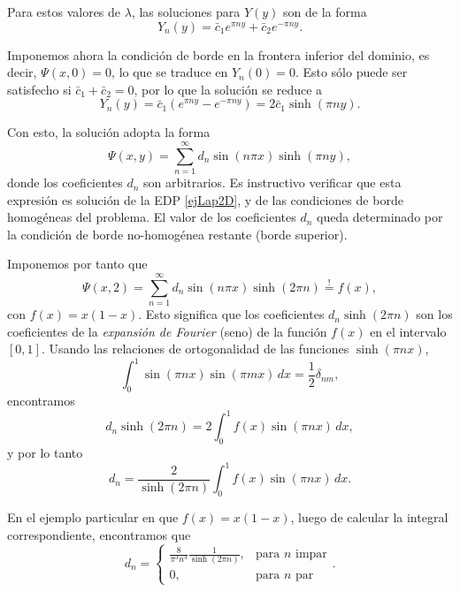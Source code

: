 Para estos valores de $\lambda$, las soluciones para $Y(y)$ son de la forma
\begin{equation}
    Y_n(y) = \bar{c}_1e^{\pi ny} + \bar{c}_2e^{-\pi ny}.
\end{equation}

Imponemos ahora la condición de borde en la frontera inferior del dominio, es decir, $\Psi(x,0) = 0$, lo que se traduce en $Y_n(0)=0$. Esto sólo puede ser satisfecho si $\bar{c}_1+\bar{c}_2=0$, por lo que la solución se reduce a
\begin{equation}
    Y_n(y) = \bar{c}_1\left(e^{\pi ny} -e^{-\pi ny}\right) = 2\bar{c}_1 \sinh(\pi ny).
\end{equation}

Con esto, la solución adopta la forma
\begin{equation}\label{ejLap2D2}
    \Psi(x,y) = \sum_{n=1}^\infty d_n \sin\left(n\pi x\right)\sinh(\pi ny),
\end{equation}
donde los coeficientes $d_n$ son arbitrarios. Es instructivo verificar que esta expresión es solución de la EDP \eqref{ejLap2D}, y de las condiciones de borde homogéneas del problema. El valor de los coeficientes $d_n$ queda determinado por la condición de borde no-homogénea restante (borde superior).

Imponemos por tanto que
\begin{equation}
    \Psi(x,2) = \sum_{n=1}^\infty d_n \sin\left(n\pi x\right)\sinh(2\pi n) \stackrel{!}{=} f(x),
\end{equation}
con $f(x)=x(1-x)$. Esto significa que los coeficientes $d_n\sinh(2\pi n)$ son los coeficientes de la \textit{expansión de Fourier} (seno) de la función $f(x)$ en el intervalo $[0,1]$. Usando las relaciones de ortogonalidad de las funciones $\sinh(\pi nx)$,
\begin{equation}
    \int_0^1 \sin(\pi nx)\sin(\pi mx)\,dx = \frac{1}{2}\delta_{nm},
\end{equation}
encontramos
\begin{equation}
    d_n\sinh(2\pi n) = 2 \int_0^1 f(x)\sin(\pi nx)\,dx,
\end{equation}
y por lo tanto
\begin{equation}
    d_n = \frac{2}{\sinh(2\pi n)} \int_0^1 f(x)\sin(\pi nx)\,dx.
\end{equation}

En el ejemplo particular en que $f(x)=x(1-x)$, luego de calcular la integral correspondiente, encontramos que
\begin{equation}
    d_n = \begin{cases}
        \frac{8}{\pi^3n^3}\frac{1}{\sinh(2\pi n)} , & \text{para } n \text{ impar} \\
        0 ,                                         & \text{para } n \text{ par}\end{cases}.
\end{equation}

